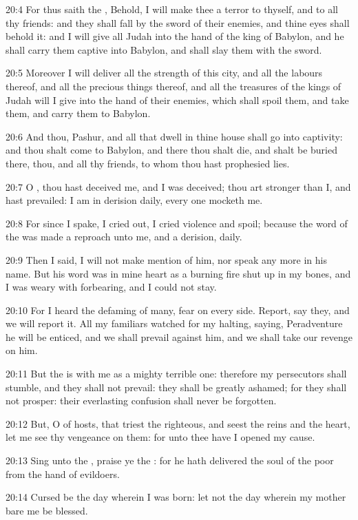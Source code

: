20:4 For thus saith the \LORD, Behold, I will make thee a terror to
thyself, and to all thy friends: and they shall fall by the sword of
their enemies, and thine eyes shall behold it: and I will give all
Judah into the hand of the king of Babylon, and he shall carry them
captive into Babylon, and shall slay them with the sword.

20:5 Moreover I will deliver all the strength of this city, and all
the labours thereof, and all the precious things thereof, and all the
treasures of the kings of Judah will I give into the hand of their
enemies, which shall spoil them, and take them, and carry them to
Babylon.

20:6 And thou, Pashur, and all that dwell in thine house shall go into
captivity: and thou shalt come to Babylon, and there thou shalt die,
and shalt be buried there, thou, and all thy friends, to whom thou
hast prophesied lies.

20:7 O \LORD, thou hast deceived me, and I was deceived; thou art
stronger than I, and hast prevailed: I am in derision daily, every one
mocketh me.

20:8 For since I spake, I cried out, I cried violence and spoil;
because the word of the \LORD was made a reproach unto me, and a
derision, daily.

20:9 Then I said, I will not make mention of him, nor speak any more
in his name. But his word was in mine heart as a burning fire shut up
in my bones, and I was weary with forbearing, and I could not stay.

20:10 For I heard the defaming of many, fear on every side. Report,
say they, and we will report it. All my familiars watched for my
halting, saying, Peradventure he will be enticed, and we shall prevail
against him, and we shall take our revenge on him.

20:11 But the \LORD is with me as a mighty terrible one: therefore my
persecutors shall stumble, and they shall not prevail: they shall be
greatly ashamed; for they shall not prosper: their everlasting
confusion shall never be forgotten.

20:12 But, O \LORD of hosts, that triest the righteous, and seest the
reins and the heart, let me see thy vengeance on them: for unto thee
have I opened my cause.

20:13 Sing unto the \LORD, praise ye the \LORD: for he hath delivered
the soul of the poor from the hand of evildoers.

20:14 Cursed be the day wherein I was born: let not the day wherein my
mother bare me be blessed.

